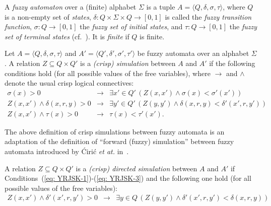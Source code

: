 \documentclass[11pt]{article}
\def\tuple#1{\langle#1\rangle}
\def\eqref#1{(\ref{#1})}
\newcommand{\E}{\exists}
\begin{document}
A {\em fuzzy automaton} over a (finite) alphabet $\Sigma$ is a tuple $A = \tuple{Q,\delta,\sigma,\tau}$, where $Q$ is a non-empty set of {\em states}, $\delta: Q \times \Sigma \times Q \to [0,1]$ is called the {\em fuzzy transition function}, $\sigma: Q \to [0,1]$ the {\em fuzzy set of initial states}, and $\tau: Q \to [0,1]$ the {\em fuzzy set of terminal states} (cf.~\cite{CiricIDB12}). It is {\em finite} if $Q$ is finite.

Let $A = \tuple{Q,\delta,\sigma,\tau}$ and $A' = \tuple{Q',\delta',\sigma',\tau'}$ be fuzzy automata over an alphabet $\Sigma$. 
A relation $Z \subseteq Q \times Q'$ is a {\em (crisp) simulation} between $A$ and $A'$ if the following conditions hold (for all possible values of the free variables), where $\to$ and $\land$ denote the usual crisp logical connectives: 
\begin{eqnarray}
\sigma(x) > 0 & \to & \E x' \in Q'\, (Z(x,x') \land \sigma(x) < \sigma'(x')) \label{eq: YRJSK-1} \\
Z(x,x') \land \delta(x,r,y) > 0 & \to & \E y' \in Q'\, (Z(y,y') \land \delta(x,r,y) < \delta'(x',r,y')) \label{eq: YRJSK-2} \\
Z(x,x') \land \tau(x) > 0 & \to & \tau(x) < \tau'(x'). \label{eq: YRJSK-3} 
\end{eqnarray}

The above definition of crisp simulations between fuzzy automata is an adaptation of the definition of ``forward (fuzzy) simulation'' between fuzzy automata introduced by {\'C}iri{\'c} {\em et at.} in~\cite{CiricIDB12}.  

A relation $Z \subseteq Q \times Q'$ is a {\em (crisp) directed simulation} between $A$ and $A'$ if Conditions~\eqref{eq: YRJSK-1}-\eqref{eq: YRJSK-3} and the following one hold (for all possible values of the free variables):
\begin{eqnarray}
Z(x,x') \land \delta'(x',r,y') > 0 & \to & \E y \in Q\, (Z(y,y') \land \delta'(x',r,y') < \delta(x,r,y)) \label{eq: YRJSK-4}
\end{eqnarray}
\end{document}
